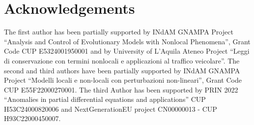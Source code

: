 \documentclass[11pt,reqno]{amsart}
\theoremstyle{definition}
\numberwithin{equation}{section}
\begin{document}
\section*{Acknowledgements} 
The first author has been partially supported by INdAM GNAMPA Project “Analysis and Control of Evolutionary Models with Nonlocal Phenomena'', Grant Code CUP E5324001950001 and by University of L'Aquila Ateneo Project “Leggi di conservazione con termini nonlocali e applicazioni al traffico veicolare''. The second and third authors have been partially supported by INdAM GNAMPA Project “Modelli locali e non-locali con perturbazioni non-lineari'', Grant Code CUP E55F22000270001. The third Author has been supported by PRIN 2022 “Anomalies in partial differential equations and applications” CUP H53C24000820006 and NextGenerationEU project CN00000013 -  CUP H93C22000450007.  
\end{document}

